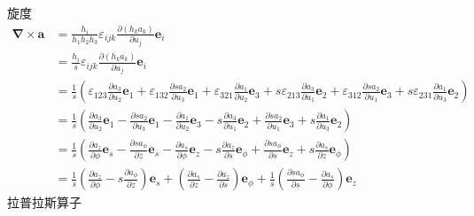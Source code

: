 旋度
\begin{align}
    \boldsymbol{\nabla}\times\boldsymbol{a}&=\frac{h_i}{h_1h_2h_3}\varepsilon_{ijk}\frac{\partial (h_ka_k)}{\partial u_j}\boldsymbol{e}_i\nonumber\\
    &=\frac{h_i}{s}\varepsilon_{ijk}\frac{\partial (h_ka_k)}{\partial u_j}\boldsymbol{e}_i\nonumber\\
    &=\frac{1}{s}\left(\varepsilon_{123}\frac{\partial a_3}{\partial u_2}\boldsymbol{e}_1
    +\varepsilon_{132}\frac{\partial sa_2}{\partial u_3}\boldsymbol{e}_1
    +\varepsilon_{321}\frac{\partial a_1}{\partial u_2}\boldsymbol{e}_3
    +s\varepsilon_{213}\frac{\partial a_3}{\partial u_1}\boldsymbol{e}_2
    +\varepsilon_{312}\frac{\partial sa_2}{\partial u_1}\boldsymbol{e}_3
    +s\varepsilon_{231}\frac{\partial a_1}{\partial u_3}\boldsymbol{e}_2\right)\nonumber\\
    &=\frac{1}{s}\left(\frac{\partial a_3}{\partial u_2}\boldsymbol{e}_1
    -\frac{\partial sa_2}{\partial u_3}\boldsymbol{e}_1
    -\frac{\partial a_1}{\partial u_2}\boldsymbol{e}_3
    -s\frac{\partial a_3}{\partial u_1}\boldsymbol{e}_2
    +\frac{\partial sa_2}{\partial u_1}\boldsymbol{e}_3
    +s\frac{\partial a_1}{\partial u_3}\boldsymbol{e}_2\right)\nonumber\\
    &=\frac{1}{s}\left(\frac{\partial a_{z}}{\partial \phi}\boldsymbol{e}_s
    -\frac{\partial sa_{\phi}}{\partial z}\boldsymbol{e}_s
    -\frac{\partial a_s}{\partial \phi}\boldsymbol{e}_z
    -s\frac{\partial a_{z}}{\partial s}\boldsymbol{e}_\phi
    +\frac{\partial sa_{\phi}}{\partial s}\boldsymbol{e}_z
    +s\frac{\partial a_s}{\partial z}\boldsymbol{e}_\phi\right)\nonumber\\
    &=\frac{1}{s}\left(\frac{\partial a_{z}}{\partial \phi}-s\frac{\partial a_{\phi}}{\partial z}\right)\boldsymbol{e}_s
    +\left(\frac{\partial a_s}{\partial z}-\frac{\partial a_{z}}{\partial s}\right)\boldsymbol{e}_\phi
    +\frac{1}{s}\left(\frac{\partial sa_{\phi}}{\partial s}
    -\frac{\partial a_s}{\partial \phi}
    \right)\boldsymbol{e}_z
\end{align}
拉普拉斯算子

